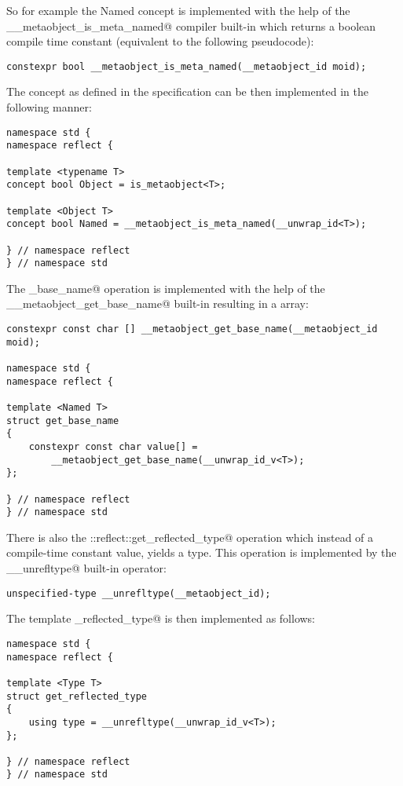 So for example the Named concept is implemented with the help of
the \verb@__metaobject_is_meta_named@ compiler built-in which returns a boolean
compile time constant (equivalent to the following pseudocode):

\begin{verbatim}
constexpr bool __metaobject_is_meta_named(__metaobject_id moid);
\end{verbatim}

The concept as defined in the specification can be then implemented in the
following manner: 

\begin{verbatim}
namespace std {
namespace reflect {

template <typename T>
concept bool Object = is_metaobject<T>;

template <Object T>
concept bool Named = __metaobject_is_meta_named(__unwrap_id<T>);

} // namespace reflect
} // namespace std
\end{verbatim}

The \verb@get_base_name@ operation is implemented with the help of the
\verb@__metaobject_get_base_name@ built-in resulting in a \verb@constexpr@
\verb@char@ array: 

\begin{verbatim}
constexpr const char [] __metaobject_get_base_name(__metaobject_id moid);

namespace std {
namespace reflect {

template <Named T>
struct get_base_name
{
	constexpr const char value[] =
		__metaobject_get_base_name(__unwrap_id_v<T>);
};

} // namespace reflect
} // namespace std
\end{verbatim}

There is also the \verb@std::reflect::get_reflected_type@ operation which instead
of a compile-time constant value, yields a type. This operation is implemented
by the \verb@__unrefltype@ built-in operator:

\begin{verbatim}
unspecified-type __unrefltype(__metaobject_id);
\end{verbatim}

The template \verb@get_reflected_type@ is then implemented as follows:

\begin{verbatim}
namespace std {
namespace reflect {

template <Type T>
struct get_reflected_type
{
	using type = __unrefltype(__unwrap_id_v<T>);
};

} // namespace reflect
} // namespace std
\end{verbatim}
